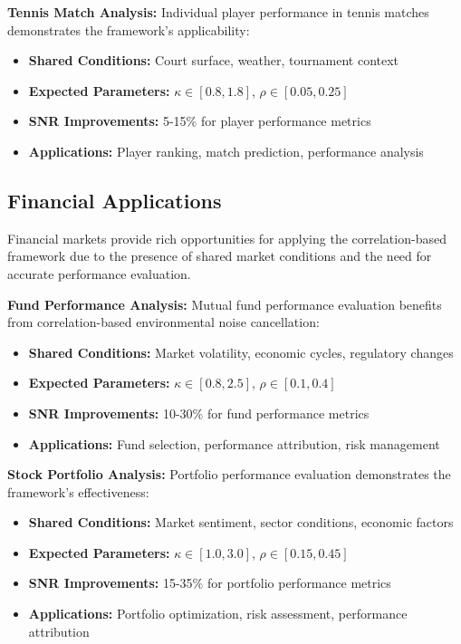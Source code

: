 \textbf{Tennis Match Analysis:}
Individual player performance in tennis matches demonstrates the framework's applicability:
\begin{itemize}
    \item \textbf{Shared Conditions:} Court surface, weather, tournament context
    \item \textbf{Expected Parameters:} $\kappa \in [0.8, 1.8]$, $\rho \in [0.05, 0.25]$
    \item \textbf{SNR Improvements:} 5-15\% for player performance metrics
    \item \textbf{Applications:} Player ranking, match prediction, performance analysis
\end{itemize}

\subsection{Financial Applications}

Financial markets provide rich opportunities for applying the correlation-based framework due to the presence of shared market conditions and the need for accurate performance evaluation.

\textbf{Fund Performance Analysis:}
Mutual fund performance evaluation benefits from correlation-based environmental noise cancellation:
\begin{itemize}
    \item \textbf{Shared Conditions:} Market volatility, economic cycles, regulatory changes
    \item \textbf{Expected Parameters:} $\kappa \in [0.8, 2.5]$, $\rho \in [0.1, 0.4]$
    \item \textbf{SNR Improvements:} 10-30\% for fund performance metrics
    \item \textbf{Applications:} Fund selection, performance attribution, risk management
\end{itemize}

\textbf{Stock Portfolio Analysis:}
Portfolio performance evaluation demonstrates the framework's effectiveness:
\begin{itemize}
    \item \textbf{Shared Conditions:} Market sentiment, sector conditions, economic factors
    \item \textbf{Expected Parameters:} $\kappa \in [1.0, 3.0]$, $\rho \in [0.15, 0.45]$
    \item \textbf{SNR Improvements:} 15-35\% for portfolio performance metrics
    \item \textbf{Applications:} Portfolio optimization, risk assessment, performance attribution
\end{itemize}

